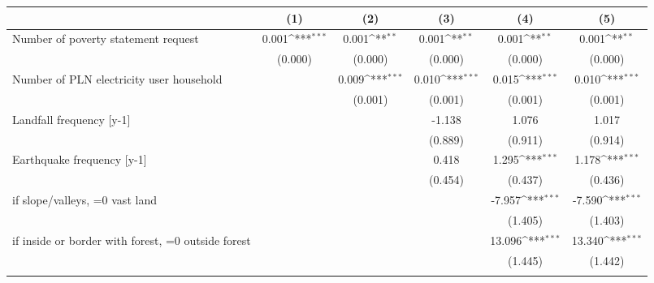 {
\def\sym#1{\ifmmode^{#1}\else\(^{#1}\)\fi}
\begin{tabular}{l*{5}{c}}
\toprule
                    &\multicolumn{1}{c}{(1)}         &\multicolumn{1}{c}{(2)}         &\multicolumn{1}{c}{(3)}         &\multicolumn{1}{c}{(4)}         &\multicolumn{1}{c}{(5)}         \\
\midrule
Number of poverty statement request&       0.001\sym{***}&       0.001\sym{**} &       0.001\sym{**} &       0.001\sym{**} &       0.001\sym{**} \\
                    &     (0.000)         &     (0.000)         &     (0.000)         &     (0.000)         &     (0.000)         \\
\addlinespace
Number of PLN electricity user household&                     &       0.009\sym{***}&       0.010\sym{***}&       0.015\sym{***}&       0.010\sym{***}\\
                    &                     &     (0.001)         &     (0.001)         &     (0.001)         &     (0.001)         \\
\addlinespace
Landfall frequency [y-1]&                     &                     &      -1.138         &       1.076         &       1.017         \\
                    &                     &                     &     (0.889)         &     (0.911)         &     (0.914)         \\
\addlinespace
Earthquake frequency [y-1]&                     &                     &       0.418         &       1.295\sym{***}&       1.178\sym{***}\\
                    &                     &                     &     (0.454)         &     (0.437)         &     (0.436)         \\
\addlinespace
=1 if slope/valleys, =0 vast land&                     &                     &                     &      -7.957\sym{***}&      -7.590\sym{***}\\
                    &                     &                     &                     &     (1.405)         &     (1.403)         \\
\addlinespace
=1 if inside or border with forest, =0 outside forest&                     &                     &                     &      13.096\sym{***}&      13.340\sym{***}\\
                    &                     &                     &                     &     (1.445)         &     (1.442)         \\
\addlinespace

\end{tabular}}
